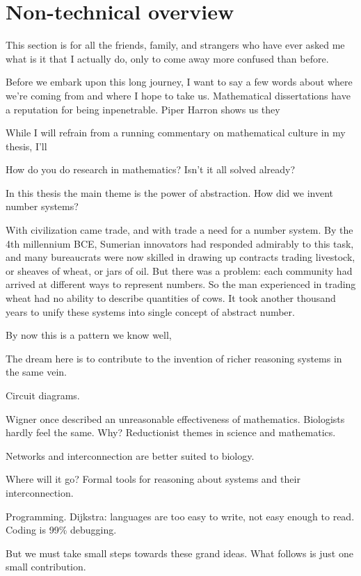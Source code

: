 {}
\chapter*{Non-technical overview}

This section is for all the friends, family, and strangers who have ever asked
me what is it that I actually do, only to come away more confused than before.

Before we embark upon this long journey, I want to say a few words about where
we're coming from and where I hope to take us. Mathematical dissertations have a
reputation for being inpenetrable. Piper Harron shows us they 

While I will refrain from a running commentary on mathematical culture in my thesis, I'll 


How do you do research in mathematics? Isn't it all solved already?

In this thesis the main theme is the power of abstraction. How did we invent
number systems?

With civilization came trade, and with trade a need for a number system. By the 4th millennium BCE, Sumerian innovators had responded admirably to this task, and many bureaucrats were now skilled in drawing up contracts trading livestock, or sheaves of wheat, or jars of oil. But there was a problem: each community had arrived at different ways to represent numbers. So the man experienced in trading wheat had no ability to describe quantities of cows. It took another thousand years to unify these systems into single concept of abstract number.

By now this is a pattern we know well, 

The dream here is to contribute to the invention of richer reasoning systems in
the same vein.

Circuit diagrams.

Wigner once described an unreasonable effectiveness of mathematics. Biologists hardly feel the same.
Why? Reductionist themes in science and mathematics.

Networks and interconnection are better suited to biology.

Where will it go? Formal tools for reasoning about systems and their
interconnection.

Programming. Dijkstra: languages are too easy to write, not easy enough to read. Coding is 99\% debugging.

But we must take small steps towards these grand ideas. What follows is just one
small contribution.

